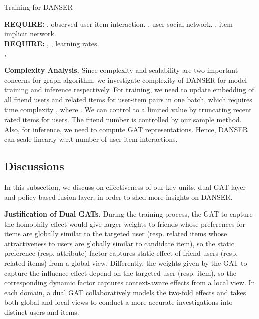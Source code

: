 \documentclass[sigconf]{acmart}
\begin{document}
\begin{algorithm}[h]
	\caption{Training for DANSER}
	\label{alg}
	\textbf{REQUIRE:} , observed user-item interaction. , user social network. , item implicit network.\\
	\textbf{REQUIRE:} , , learning rates.\\
	{
	, \;}
\end{algorithm}

\textbf{Complexity Analysis.} Since complexity and scalability are two important concerns for graph algorithm, we investigate complexity of DANSER for model training and inference respectively. For training, we need to update embedding of all friend users and related items for  user-item pairs in one batch, which requires time complexity , where . We can control  to a limited value by truncating recent  rated items for users. The friend number  is controlled by our sample method. Also, for inference, we need  to compute GAT representations. Hence, DANSER can scale linearly w.r.t number of user-item interactions.

\subsection{Discussions}

In this subsection, we discuss on effectiveness of our key units, dual GAT layer and policy-based fusion layer, in order to shed more insights on DANSER.

\textbf{Justification of Dual GATs.}
{During the} training process, the GAT to capture {the} homophily effect would give larger weights to friends whose preferences for items are globally similar to {the} targeted user (resp. related items whose attractiveness to users are globally similar to candidate item), so the static preference (resp. attribute) factor captures static effect of friend users (resp. related items) from a global view. Differently, the weights given by the GAT to capture {the} influence effect depend on {the} targeted user (resp. item), so the corresponding dynamic factor captures context-aware effect{s} from a local view. In each domain, a dual GAT collaboratively models {the} two-fold effects and takes both global and local views to conduct a more accurate investigations into distinct users and items.
\end{document}
